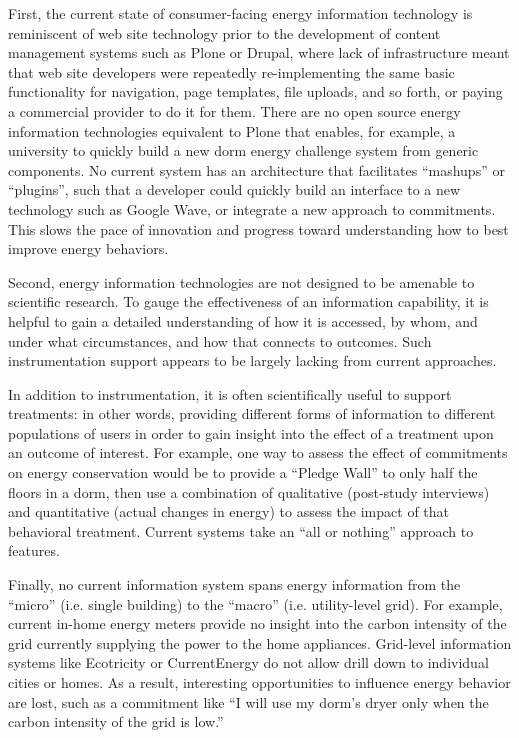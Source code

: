 First, the current state of consumer-facing energy information technology
is reminiscent of web site technology prior to the development of content
management systems such as Plone or Drupal, where lack of infrastructure
meant that web site developers were repeatedly re-implementing the same
basic functionality for navigation, page templates, file uploads, and so
forth, or paying a commercial provider to do it for them.  There are no
open source energy information technologies equivalent to Plone that
enables, for example, a university to quickly build a new dorm energy
challenge system from generic components.  No current system has an
architecture that facilitates ``mashups'' or ``plugins'', such that a
developer could quickly build an interface to a new technology such as
Google Wave, or integrate a new approach to commitments. This slows the
pace of innovation and progress toward understanding how to best improve
energy behaviors.

Second, energy information technologies are not designed to be amenable to
scientific research.  To gauge the effectiveness of an information
capability, it is helpful to gain a detailed understanding of how it is
accessed, by whom, and under what circumstances, and how that connects
to outcomes.  Such instrumentation support appears to be largely lacking
from current approaches.

In addition to instrumentation, it is often scientifically useful to
support treatments: in other words, providing different forms of
information to different populations of users in order to gain insight into
the effect of a treatment upon an outcome of interest. For example, one way
to assess the effect of commitments on energy conservation would be to
provide a ``Pledge Wall'' to only half the floors in a dorm, then use a
combination of qualitative (post-study interviews) and quantitative (actual
changes in energy) to assess the impact of that behavioral
treatment. Current systems take an ``all or nothing'' approach to
features. 

Finally, no current information system spans energy information from the ``micro''
(i.e. single building) to the ``macro'' (i.e. utility-level grid).  For
example, current in-home energy meters provide no insight into the carbon
intensity of the grid currently supplying the power to the home appliances.
Grid-level information systems like Ecotricity or CurrentEnergy do not
allow drill down to individual cities or homes.  As a result, interesting
opportunities to influence energy behavior are lost, such as a commitment
like ``I will use my dorm's dryer only when the carbon intensity of the grid is low.''

